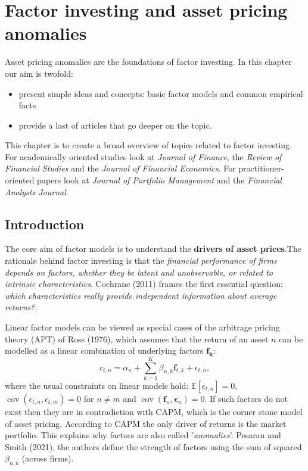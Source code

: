 \section{Factor investing and asset pricing anomalies}

Asset pricing anomalies are the foundations of factor investing. In this chapter our aim is twofold:
\begin{itemize}
    \item present simple ideas and concepts: basic factor models and common empirical facts
    \item provide a last of articles that go deeper on the topic.
\end{itemize}

This chapter is to create a broad overview of topics related to factor investing. For academically oriented studies look at \textit{Journal of Finance}, the \textit{Review of Financial Studies} and the \textit{Journal of Financial Economics}. For practitioner-oriented papers look at \textit{Journal of Portfolio Management} and the \textit{Financial Analysts Journal}.

\subsection{Introduction}
The core aim of factor models is to understand the \textbf{drivers of asset prices}.The rationale behind factor investing is that the \textit{financial performance of firms depends on factors, whether they be latent and unobservable, or related to intrinsic characteristics}. Cochrane (2011) frames the first essential question: \textit{which characteristics really provide independent information about average returns?}.

Linear factor models can be viewed as special cases of the arbitrage pricing theory (APT) of Ross (1976), which assumes that the return of an asset $n$ can be modelled as a linear combination of underlying factors $\boldsymbol{f_{k}}$:
\begin{equation}
    r_{t,n} = \alpha_{n} + \sum_{k=1}^{K} \beta_{n,k} \boldsymbol{f}_{t,k} + \epsilon_{t,n}, \label{eq:3}
\end{equation}
where the usual constraints on linear models hold: $\mathbb{E}[\epsilon _{t,n}] = 0$, $\operatorname{cov}(\epsilon _{t,n}, \epsilon_{t,m}) = 0$ for $n \neq m$ and $\operatorname{cov}(\mathbf{f}_{n}, \mathbf{\epsilon}_{n}) = 0$. If such factors do not exist then they are in contradiction with CAPM, which is the corner stone model of asset pricing. According to CAPM the only driver of returns is the market portfolio. This explains why factors are also called '\textit{anomalies}'. Pesaran and Smith (2021), the authors define the strength of factors using the sum of squared $\beta _{n,k}$ (across firms).


